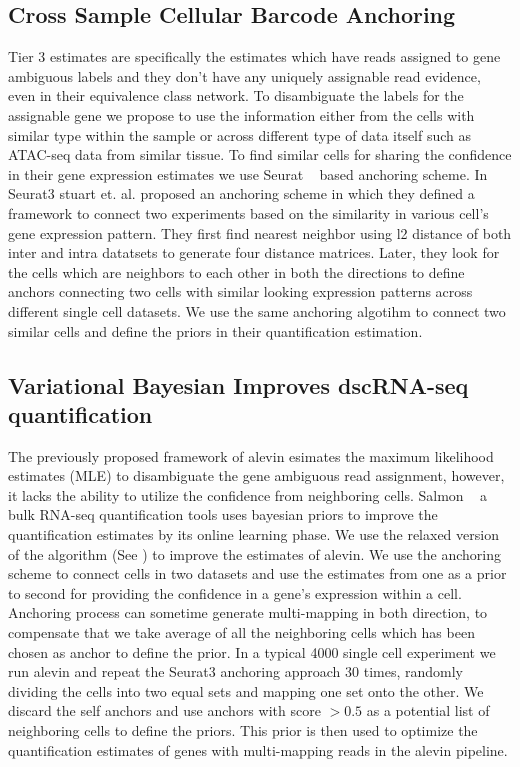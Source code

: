 \subsection{Cross Sample Cellular Barcode Anchoring}
Tier 3 estimates are specifically the estimates which have reads assigned to gene ambiguous 
labels and they don't have any uniquely assignable read evidence, even in their equivalence 
class network. To disambiguate the labels for the assignable gene we propose to use the 
information either from the cells with similar type within the sample or across different 
type of data itself such as ATAC-seq data from similar tissue. To find similar cells for sharing 
the confidence in their gene expression estimates we use Seurat ~\citep{seurat3} based anchoring 
scheme. In Seurat3 stuart et. al. proposed an anchoring scheme in which they defined a framework 
to connect two experiments based on the similarity in various cell's gene expression pattern. 
They first find nearest neighbor using l2 distance of both inter and intra datatsets to generate 
four distance matrices. Later, they look for the cells which are neighbors to each other in both 
the directions to define anchors connecting two cells with similar looking expression patterns 
across different single cell datasets. We use the same anchoring algotihm to connect two similar 
cells and define the priors in their quantification estimation.

\subsection{Variational Bayesian Improves dscRNA-seq quantification}
The previously proposed framework of alevin esimates the maximum likelihood estimates (MLE) to 
disambiguate the gene ambiguous read assignment, however, it lacks the ability to utilize the 
confidence from neighboring cells. Salmon ~\citep{salmon} a bulk RNA-seq quantification tools uses 
bayesian priors to improve the quantification estimates by its online learning phase. We use the 
relaxed version of the algorithm (See ) to improve the estimates of alevin. 
We use the anchoring scheme to connect cells in two datasets and use the estimates from one as a 
prior to second for providing the confidence in a gene's expression within a cell. Anchoring process 
can sometime generate multi-mapping in both direction, to compensate that we take average of all 
the neighboring cells which has been chosen as anchor to define the prior. In a typical 4000 single 
cell experiment we run alevin and repeat the Seurat3 anchoring approach $30$ times, randomly dividing 
the cells into two equal sets and mapping one set onto the other. We discard the self anchors and use 
anchors with score $>0.5$ as a potential list of neighboring cells to define the priors. This prior 
is then used to optimize the quantification estimates of genes with multi-mapping reads in the alevin 
pipeline.


